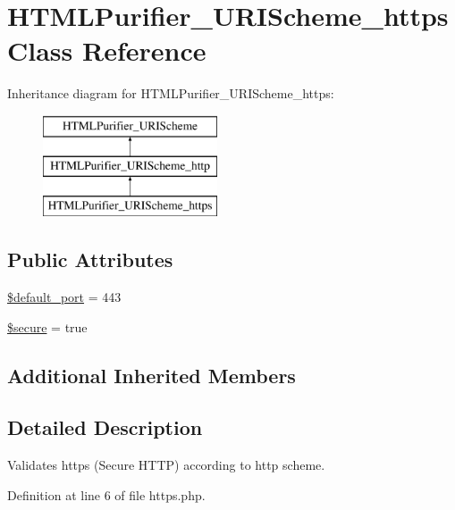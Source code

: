 \hypertarget{classHTMLPurifier__URIScheme__https}{\section{H\+T\+M\+L\+Purifier\+\_\+\+U\+R\+I\+Scheme\+\_\+https Class Reference}
\label{classHTMLPurifier__URIScheme__https}
}
Inheritance diagram for H\+T\+M\+L\+Purifier\+\_\+\+U\+R\+I\+Scheme\+\_\+https\+:\begin{figure}[H]
\begin{center}
\leavevmode
\includegraphics[height=3.000000cm]{classHTMLPurifier__URIScheme__https}
\end{center}
\end{figure}
\subsection*{Public Attributes}
\begin{DoxyCompactItemize}
\item 
\hyperlink{classHTMLPurifier__URIScheme__https_a6e15c5f519ce4fb44ead473555741f90}{\$default\+\_\+port} = 443
\item 
\hyperlink{classHTMLPurifier__URIScheme__https_a4d28074cb176b324d57c89a194f133ea}{\$secure} = true
\end{DoxyCompactItemize}
\subsection*{Additional Inherited Members}


\subsection{Detailed Description}
Validates https (Secure H\+T\+T\+P) according to http scheme. 

Definition at line 6 of file https.\+php.



